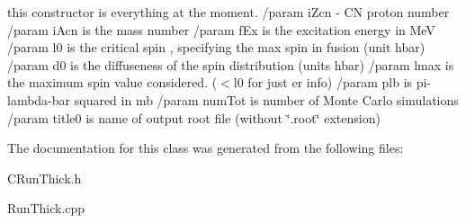 this constructor is everything at the moment. /param i\-Zcn - CN proton number /param i\-Acn is the mass number /param f\-Ex is the excitation energy in Me\-V /param l0 is the critical spin , specifying the max spin in fusion (unit hbar) /param d0 is the diffuseness of the spin distribution (units hbar) /param lmax is the maximum spin value considered. ($<$l0 for just er info) /param plb is pi-lambda-bar squared in mb /param num\-Tot is number of Monte Carlo simulations /param title0 is name of output root file (without \char`\"{}.root\char`\"{} extension) 

The documentation for this class was generated from the following files:\begin{CompactItemize}
\item 
CRun\-Thick.h\item 
Run\-Thick.cpp\end{CompactItemize}
